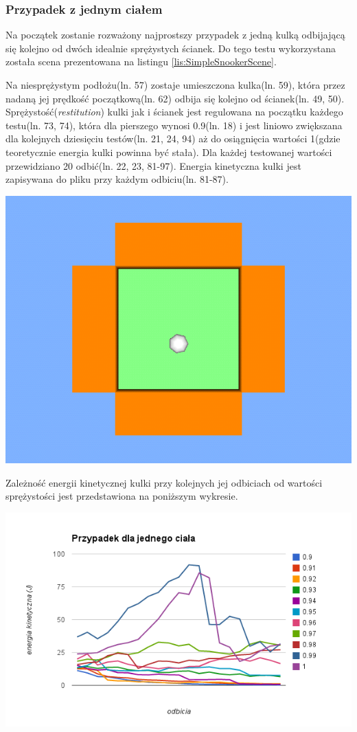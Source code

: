\documentclass[12pt]{article}
\begin{document}
\subsubsection{Przypadek z jednym ciałem}
Na początek zostanie rozważony najprostszy przypadek z jedną kulką odbijającą
się kolejno od dwóch idealnie sprężystych ścianek. Do tego testu wykorzystana
została scena prezentowana na listingu \ref{lis:SimpleSnookerScene}.
 
Na niesprężystym podłożu(ln. 57) zostaje umieszczona kulka(ln. 59), która przez
nadaną jej prędkość początkową(ln. 62) odbija się kolejno od ścianek(ln. 49,
50). Sprężystość(\emph{restitution}) kulki jak i ścianek jest regulowana na
początku każdego testu(ln. 73, 74), która dla pierszego wynosi 0.9(ln. 18) i
jest liniowo zwiększana dla kolejnych dziesięciu testów(ln. 21, 24, 94) aż do
osiągnięcia wartości 1(gdzie teoretycznie energia kulki powinna być stała).
Dla każdej testowanej wartości przewidziano 20 odbić(ln. 22, 23, 81-97). Energia
kinetyczna kulki jest zapisywana do pliku przy każdym odbiciu(ln. 81-87).

\includegraphics[width=\textwidth]{./img/SimpleSnookerScene.png}

Zależność energii kinetycznej kulki przy kolejnych jej odbiciach od wartości
sprężystości jest przedstawiona na poniższym wykresie.

\includegraphics[width=\textwidth]{./img/chart_1.png}
\end{document}
